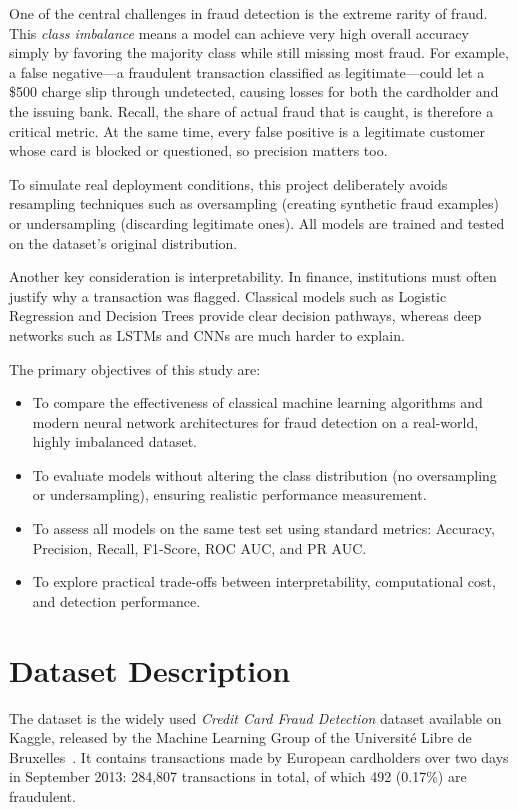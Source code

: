 \documentclass[journal]{IEEEtran}
\begin{document}
One of the central challenges in fraud detection is the extreme rarity of fraud. This \emph{class imbalance} means a model can achieve very high overall accuracy simply by favoring the majority class while still missing most fraud. For example, a false negative---a fraudulent transaction classified as legitimate---could let a \$500 charge slip through undetected, causing losses for both the cardholder and the issuing bank. Recall, the share of actual fraud that is caught, is therefore a critical metric. At the same time, every false positive is a legitimate customer whose card is blocked or questioned, so precision matters too.

To simulate real deployment conditions, this project deliberately avoids resampling techniques such as oversampling (creating synthetic fraud examples) or undersampling (discarding legitimate ones). All models are trained and tested on the dataset's original distribution.

Another key consideration is interpretability. In finance, institutions must often justify why a transaction was flagged. Classical models such as Logistic Regression and Decision Trees provide clear decision pathways, whereas deep networks such as LSTMs and CNNs are much harder to explain.

The primary objectives of this study are:
\begin{itemize}
  \item To compare the effectiveness of classical machine learning algorithms and modern neural network architectures for fraud detection on a real-world, highly imbalanced dataset.
  \item To evaluate models without altering the class distribution (no oversampling or undersampling), ensuring realistic performance measurement.
  \item To assess all models on the same test set using standard metrics: Accuracy, Precision, Recall, F1-Score, ROC AUC, and PR AUC.
  \item To explore practical trade-offs between interpretability, computational cost, and detection performance.
\end{itemize}

\section{Dataset Description}
The dataset is the widely used \emph{Credit Card Fraud Detection} dataset available on Kaggle, released by the Machine Learning Group of the Universit\'e Libre de Bruxelles~\cite{kaggle}. It contains transactions made by European cardholders over two days in September 2013: 284,807 transactions in total, of which 492 (0.17\%) are fraudulent.
\end{document}
